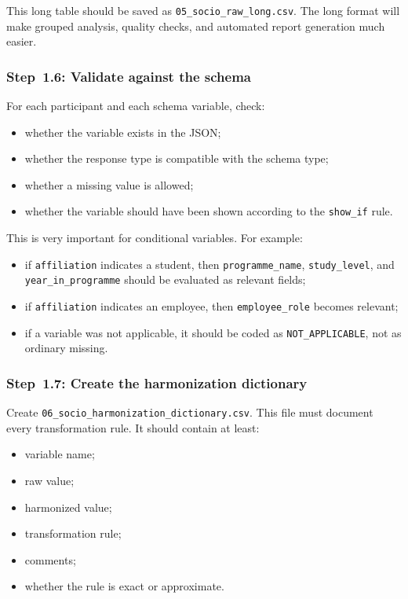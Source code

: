 \documentclass[11pt]{article}
\begin{document}
This long table should be saved as \texttt{05\_socio\_raw\_long.csv}.
The long format will make grouped analysis, quality checks, and automated report generation much easier.

\subsubsection{Step~1.6: Validate against the schema}
For each participant and each schema variable, check:
\begin{itemize}
    \item whether the variable exists in the JSON;
    \item whether the response type is compatible with the schema type;
    \item whether a missing value is allowed;
    \item whether the variable should have been shown according to the \texttt{show\_if} rule.
\end{itemize}

This is very important for conditional variables.
For example:
\begin{itemize}
    \item if \texttt{affiliation} indicates a student, then \texttt{programme\_name},
    \texttt{study\_level}, and \texttt{year\_in\_programme} should be evaluated as relevant fields;
    \item if \texttt{affiliation} indicates an employee, then \texttt{employee\_role}
    becomes relevant;
    \item if a variable was not applicable, it should be coded as \texttt{NOT\_APPLICABLE},
    not as ordinary missing.
\end{itemize}

\subsubsection{Step~1.7: Create the harmonization dictionary}
Create \texttt{06\_socio\_harmonization\_dictionary.csv}.
This file must document every transformation rule.
It should contain at least:
\begin{itemize}
    \item variable name;
    \item raw value;
    \item harmonized value;
    \item transformation rule;
    \item comments;
    \item whether the rule is exact or approximate.
\end{itemize}
\end{document}
